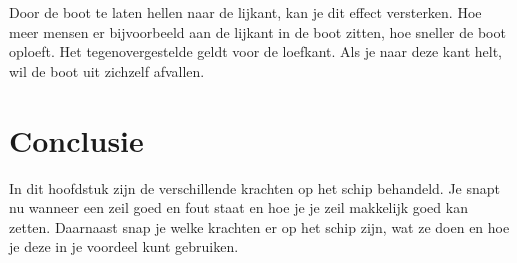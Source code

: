 Door de boot te laten hellen naar de lijkant, kan je dit effect versterken. Hoe meer mensen er bijvoorbeeld aan de lijkant in de boot zitten, hoe sneller de boot oploeft. Het tegenovergestelde geldt voor de loefkant. Als je naar deze kant helt, wil de boot uit zichzelf afvallen. 
\section{Conclusie}
In dit hoofdstuk zijn de verschillende krachten op het schip behandeld. Je snapt nu wanneer een zeil goed en fout staat en hoe je je zeil makkelijk goed kan zetten. Daarnaast snap je welke krachten er op het schip zijn, wat ze doen en hoe je deze in je voordeel kunt gebruiken.  